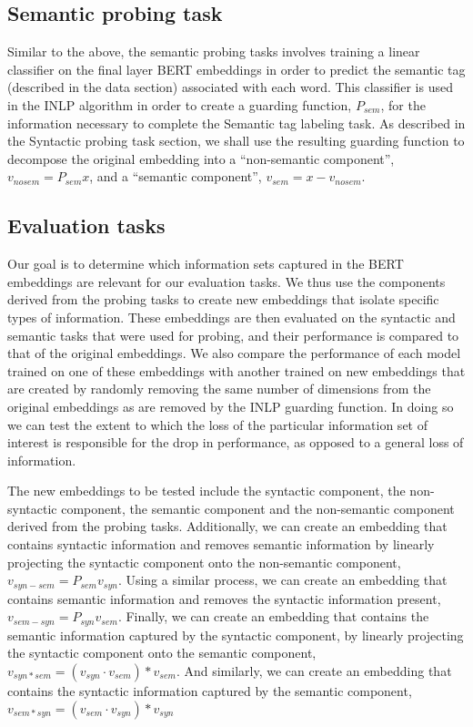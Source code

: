 \documentclass[11pt,a4paper]{article}
\begin{document}
\subsection{Semantic probing task}
\label{sec:semantics}

Similar to the above, the semantic probing tasks involves training a linear classifier on the final layer BERT embeddings in order to predict the semantic tag (described in the data section) associated with each word. This classifier is used in the INLP algorithm in order to create a guarding function, $P_{sem}$, for the information necessary to complete the Semantic tag labeling task. As described in the Syntactic probing task section, we shall use the resulting guarding function to decompose the original embedding into a ``non-semantic component'', $v_{no sem} = P_{sem} x$, and a ``semantic component'', $v_{sem} = x - v_{no sem}$. 


\subsection{Evaluation tasks}
\label{sec:eval}

Our goal is to determine which information sets captured in the BERT embeddings are relevant for our evaluation tasks. We thus use the components derived from the probing tasks to create new embeddings that isolate specific types of information. These embeddings are then evaluated on the syntactic and semantic tasks that were used for probing, and their performance is compared to that of the original embeddings. We also compare the performance of each model trained on one of these embeddings with another trained on new embeddings that are created by randomly removing the same number of dimensions from the original embeddings as are removed by the INLP guarding function. In doing so we can test the extent to which the loss of the particular information set of interest is responsible for the drop in performance, as opposed to a general loss of information. 

The new embeddings to be tested include the syntactic component, the non-syntactic component, the semantic component and the non-semantic component derived from the probing tasks. Additionally, we can create an embedding that contains syntactic information and removes semantic information by linearly projecting the syntactic component onto the non-semantic component, $v_{syn - sem} = P_{sem} v_{syn}$. Using a similar process, we can create an embedding that contains semantic information and removes the syntactic information present, $v_{sem - syn} = P_{syn} v_{sem}$. Finally, we can create an embedding that contains the semantic information captured by the syntactic component, by linearly projecting the syntactic component onto the semantic component, $v_{syn * sem} = (v_{syn} \cdot v_{sem}) * v_{sem}$. And similarly, we can create an embedding that contains the syntactic information captured by the semantic component, $v_{sem * syn} = (v_{sem} \cdot v_{syn}) * v_{syn}$
\end{document}
